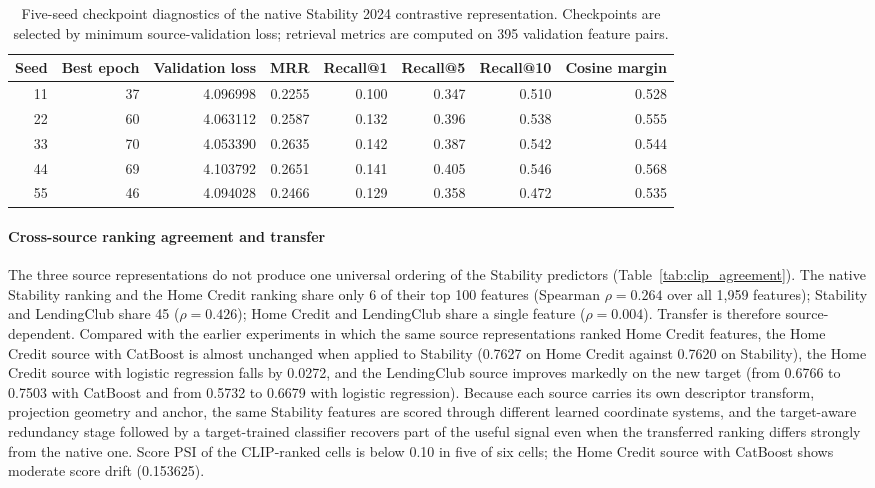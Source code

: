 \documentclass[preprint,12pt]{elsarticle}
\begin{document}
\begin{table}[htbp]
\centering
\scriptsize
\begin{threeparttable}
\caption{Five-seed checkpoint diagnostics of the native Stability 2024 contrastive representation. Checkpoints are selected by minimum source-validation loss; retrieval metrics are computed on 395 validation feature pairs.}
\label{tab:clip_seeds}
\begin{tabular}{@{}rrrrrrrr@{}}
\toprule
Seed & Best epoch & Validation loss & MRR & Recall@1 & Recall@5 & Recall@10 & Cosine margin \\
\midrule
11 & 37 & 4.096998 & 0.2255 & 0.100 & 0.347 & 0.510 & 0.528 \\
22 & 60 & 4.063112 & 0.2587 & 0.132 & 0.396 & 0.538 & 0.555 \\
33 & 70 & 4.053390 & 0.2635 & 0.142 & 0.387 & 0.542 & 0.544 \\
44 & 69 & 4.103792 & 0.2651 & 0.141 & 0.405 & 0.546 & 0.568 \\
55 & 46 & 4.094028 & 0.2466 & 0.129 & 0.358 & 0.472 & 0.535 \\
\bottomrule
\end{tabular}
\end{threeparttable}
\end{table}

\paragraph{Cross-source ranking agreement and transfer}
The three source representations do not produce one universal ordering of the Stability predictors (Table~\ref{tab:clip_agreement}). The native Stability ranking and the Home Credit ranking share only 6 of their top 100 features (Spearman $\rho=0.264$ over all 1,959 features); Stability and LendingClub share 45 ($\rho=0.426$); Home Credit and LendingClub share a single feature ($\rho=0.004$). Transfer is therefore source-dependent. Compared with the earlier experiments in which the same source representations ranked Home Credit features, the Home Credit source with CatBoost is almost unchanged when applied to Stability (0.7627 on Home Credit against 0.7620 on Stability), the Home Credit source with logistic regression falls by 0.0272, and the LendingClub source improves markedly on the new target (from 0.6766 to 0.7503 with CatBoost and from 0.5732 to 0.6679 with logistic regression). Because each source carries its own descriptor transform, projection geometry and anchor, the same Stability features are scored through different learned coordinate systems, and the target-aware redundancy stage followed by a target-trained classifier recovers part of the useful signal even when the transferred ranking differs strongly from the native one. Score PSI of the CLIP-ranked cells is below 0.10 in five of six cells; the Home Credit source with CatBoost shows moderate score drift (0.153625).
\end{document}
